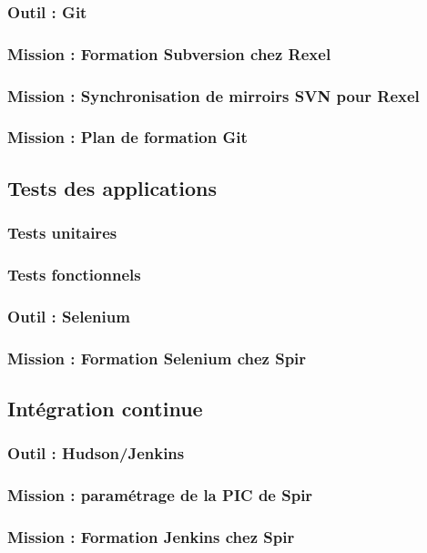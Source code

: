 \subsubsection{Outil : Git}

\subsubsection{Mission : Formation Subversion chez Rexel}

\subsubsection{Mission : Synchronisation de mirroirs SVN pour Rexel}

\subsubsection{Mission : Plan de formation Git}



\subsection{Tests des applications}

\subsubsection{Tests unitaires}

\subsubsection{Tests fonctionnels}

\subsubsection{Outil : Selenium}

\subsubsection{Mission : Formation Selenium chez Spir}



\subsection{Intégration continue}

\subsubsection{Outil : Hudson/Jenkins}

\subsubsection{Mission : paramétrage de la PIC de Spir}

\subsubsection{Mission : Formation Jenkins chez Spir}

